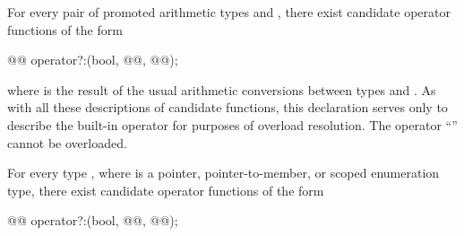 \pnum
For every pair of promoted arithmetic types
and
,
there exist candidate operator functions of the form

\begin{codeblock}
@@      operator?:(bool, @@, @@);
\end{codeblock}

where
is the result of the usual arithmetic conversions between types
and
.
\enternote
As with all these descriptions of candidate functions, this declaration serves
only to describe the built-in operator for purposes of overload resolution.
The operator
``''
cannot be overloaded.
\exitnote

\pnum
For every type
,
where
is a pointer, pointer-to-member, or scoped enumeration type, there exist candidate operator
functions of the form

\begin{codeblock}
@@       operator?:(bool, @@, @@);
\end{codeblock}%
